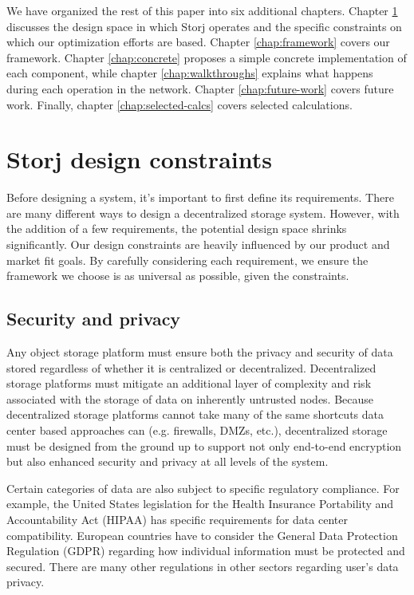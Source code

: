 \documentclass[8pt,fleqn,openany]{book}
\begin{document}
We have organized the rest of this paper into six additional
chapters. Chapter \ref{chap:design-constraints} discusses the design space
in which Storj operates and the specific constraints on which
our optimization efforts are based.
Chapter \ref{chap:framework} covers our framework. Chapter
\ref{chap:concrete}
proposes a simple concrete implementation of each component,
while chapter \ref{chap:walkthroughs} explains what happens
during each operation in the network. Chapter
\ref{chap:future-work} covers future work.
Finally, chapter \ref{chap:selected-calcs} covers selected calculations.

\chapter{Storj design constraints}\label{chap:design-constraints}

Before designing a system, it's important to first define its requirements.
There are many different ways to design a decentralized storage system. However,
with the addition of a few requirements, the potential design space shrinks
significantly.
Our design constraints are heavily influenced by our product and
market fit goals.
By carefully considering each requirement, we ensure the framework
we choose is as universal as possible, given the constraints.

\section{Security and privacy}

Any object storage platform must ensure both the privacy and
security of data stored regardless of whether it is centralized or decentralized.
Decentralized storage platforms must mitigate an additional layer of
complexity and risk associated with the storage of data on inherently
untrusted nodes. Because decentralized storage platforms cannot take many
of the same shortcuts data center based approaches can (e.g. firewalls, DMZs,
etc.), decentralized storage must be designed from the ground up to support
not only end-to-end encryption but also enhanced security and privacy at all levels of the
system.

Certain categories of data are also subject to specific regulatory compliance.
For example, the United States legislation for
the Health Insurance Portability and
Accountability Act (HIPAA) has specific requirements for data center
compatibility. European countries have to consider the General Data Protection
Regulation (GDPR) regarding
how individual information must be protected and secured. There
are many other regulations in other sectors regarding user's data privacy.
\end{document}

